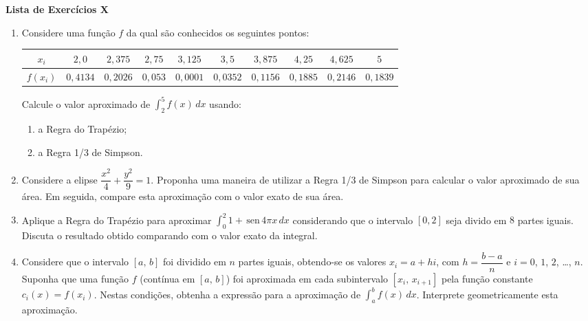 \documentclass[12pt,a4paper]{article}
\newcommand{\sen}{\,\textrm{sen}\,}
\begin{document}
\begin{center}
 \textbf{Lista de Exercícios X}
\end{center}

\begin{enumerate}
  
  \item Considere uma função $f$ da qual são conhecidos os seguintes pontos:

   \begin{center}
   \begin{tabular}{c|c|c|c|c|c|c|c|c|c}
      $x_i$ & $2,0$ & $2,375$ & $2,75$ & $3,125$ & $3,5$ & $3,875$ & $4,25$ & $4,625$ & $5$\\ \hline
      $f(x_i)$ & $0,4134$ & $0,2026$ & $0,053$ & $0,0001$ & $0,0352$ & $0,1156$ & $0,1885$ & $0,2146$ & $0,1839$
   \end{tabular}
   \end{center}

   Calcule o valor aproximado de $\displaystyle \int_2^5 f(x)\,dx$ usando:
   \begin{enumerate}
    \item a Regra do Trapézio;
    \item a Regra 1/3 de Simpson.
   \end{enumerate}
  
   \item Considere a elipse $\dfrac{x^2}{4} + \dfrac{y^2}{9} = 1$. Proponha uma maneira de utilizar a Regra 1/3 de Simpson 
para calcular o valor aproximado de sua área. Em seguida, compare esta aproximação com o valor exato de sua área.

   \item Aplique a Regra do Trapézio para aproximar $\displaystyle\int_0^2 1 + \sen 4\pi x\,dx$ considerando que o intervalo $[0, 2]$ seja 
         divido em $8$ partes iguais. Discuta o resultado obtido comparando com o valor exato da integral.

   \item Considere que o intervalo $[a,\,b]$ foi dividido em $n$ partes iguais, obtendo-se os valores $x_i = a + hi$, com $h = \dfrac{b-a}{n}$ e 
   $i=0$, $1$, $2$, \ldots, $n$. Suponha que uma função $f$ (contínua em $[a,\,b]$) foi aproximada em cada subintervalo $[x_i,\,x_{i+1}]$ pela função constante $c_i(x) = f(x_i)$.
   Nestas condições, obtenha a expressão para a aproximação de $\displaystyle\int_a^b f(x)\,dx$. Interprete geometricamente esta aproximação.

\end{enumerate}
\end{document}
